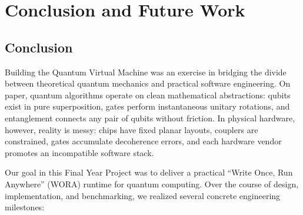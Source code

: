 
\chapter{Conclusion and Future Work}


\section{Conclusion}

Building the Quantum Virtual Machine was an exercise in bridging the divide between theoretical quantum mechanics and practical software engineering. On paper, quantum algorithms operate on clean mathematical abstractions: qubits exist in pure superposition, gates perform instantaneous unitary rotations, and entanglement connects any pair of qubits without friction. In physical hardware, however, reality is messy: chips have fixed planar layouts, couplers are constrained, gates accumulate decoherence errors, and each hardware vendor promotes an incompatible software stack.

Our goal in this Final Year Project was to deliver a practical ``Write Once, Run Anywhere'' (WORA) runtime for quantum computing. Over the course of design, implementation, and benchmarking, we realized several concrete engineering milestones:

